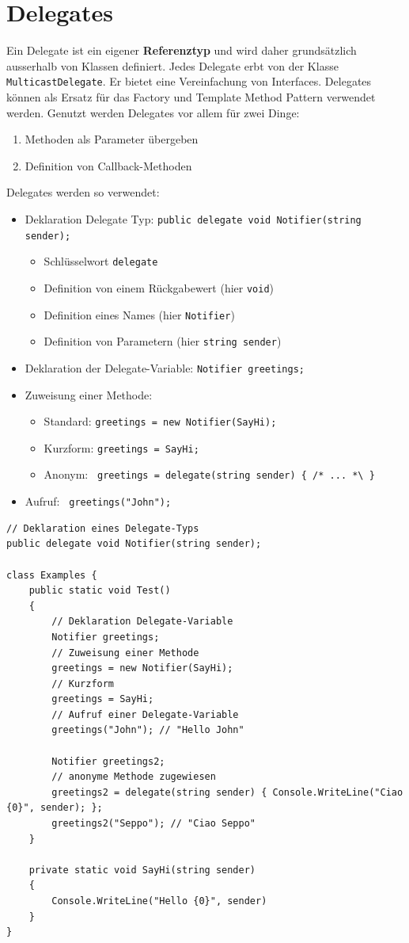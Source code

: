 \documentclass[
a4paper,
oneside,
10pt,
fleqn,
headsepline,
toc=listofnumbered, 
bibliography=totocnumbered]{scrartcl}
\let\stdsection\section
\renewcommand\section{\clearpage\stdsection}
\begin{document}
\section{Delegates}
Ein Delegate ist ein eigener \textbf{Referenztyp} und wird daher grundsätzlich ausserhalb von Klassen definiert. Jedes Delegate erbt von der Klasse \lstinline|MulticastDelegate|. Er bietet eine Vereinfachung von Interfaces. Delegates können als Ersatz für das Factory und Template Method Pattern verwendet werden.
Genutzt werden Delegates vor allem für zwei Dinge:
\begin{enumerate}
	\item Methoden als Parameter übergeben
	\item Definition von Callback-Methoden
\end{enumerate}
Delegates werden so verwendet:
\begin{itemize}
	\item Deklaration Delegate Typ: \lstinline|public delegate void Notifier(string sender);|
	      \begin{itemize}
		      \item Schlüsselwort \lstinline|delegate|
		      \item Definition von einem Rückgabewert (hier \lstinline|void|)
		      \item Definition eines Names (hier \lstinline|Notifier|)
		      \item Definition von Parametern (hier \lstinline|string sender|)
	      \end{itemize}
	\item Deklaration der Delegate-Variable: \lstinline|Notifier greetings;|
	\item Zuweisung einer Methode:
	      \begin{itemize}
		      \item Standard: \lstinline|greetings = new Notifier(SayHi);|
		      \item Kurzform: \lstinline|greetings = SayHi; |
		      \item Anonym: \lstinline| greetings = delegate(string sender) { /* ... *\ } |
	      \end{itemize}
	\item Aufruf: \lstinline| greetings("John");|
\end{itemize}
\begin{lstlisting}
// Deklaration eines Delegate-Typs 
public delegate void Notifier(string sender);
    
class Examples {
    public static void Test() 
	{
        // Deklaration Delegate-Variable
        Notifier greetings;
        // Zuweisung einer Methode 
        greetings = new Notifier(SayHi);
        // Kurzform 
        greetings = SayHi;
        // Aufruf einer Delegate-Variable 
        greetings("John"); // "Hello John"
            
        Notifier greetings2;
        // anonyme Methode zugewiesen
        greetings2 = delegate(string sender) { Console.WriteLine("Ciao {0}", sender); };
        greetings2("Seppo"); // "Ciao Seppo"
    }

	private static void SayHi(string sender)
	{
		Console.WriteLine("Hello {0}", sender)
	}
}
\end{lstlisting}
\end{document}
